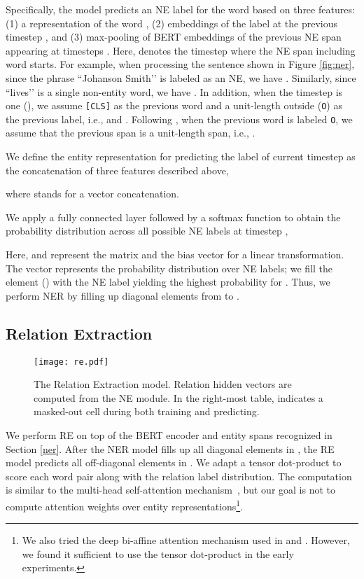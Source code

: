 \documentclass[11pt,a4paper]{article}
\begin{document}
Specifically, the model predicts an NE label for the word  based on three features: (1) a representation  of the word , (2) embeddings  of the label  at the previous timestep , and (3) max-pooling of BERT embeddings of the previous NE span appearing at timesteps . Here,  denotes the timestep where the NE span including word  starts. For example, when processing the sentence shown in Figure \ref{fig:ner}, since the phrase ``Johanson Smith’’ is labeled as an NE, we have . Similarly, since ``lives’’ is a single non-entity word, we have . In addition, when the timestep is one (), we assume {\tt [CLS]} as the previous word and a unit-length outside (\texttt{O}) as the previous label, i.e., 
 and . Following \citet{zhang-etal-2017-end}, when the previous word is labeled \texttt{O}, we assume that the previous span is a unit-length span, i.e., .

We define the entity representation for predicting the label of current timestep  as the concatenation of three features described above,

where  stands for a vector concatenation.

We apply a fully connected layer followed by a softmax function  to obtain the probability distribution across all possible NE labels at timestep ,

Here,  and  represent the matrix and the bias vector for a linear transformation. The vector  represents the probability distribution over NE labels; we fill the element  () with the NE label yielding the highest probability for . 
Thus, we perform NER by filling up diagonal elements  from  to .

\subsection{Relation Extraction}
\label{re}

    \begin{figure}[t]
    \texttt{[image: re.pdf]}
    \caption{The Relation Extraction model. Relation hidden vectors  are computed from the NE module. In the right-most table,  indicates a masked-out cell during both training and predicting.}
    \label{fig:re}
    \end{figure}



We perform RE on top of the BERT encoder and entity spans recognized in Section \ref{ner}.
After the NER model fills up all diagonal elements in , the RE model predicts all off-diagonal elements in .
We adapt a tensor dot-product to score each word pair along with the relation label distribution. The computation is similar to the multi-head self-attention mechanism~\cite{vaswani2017attention}, but our goal is not to compute attention weights over entity representations\footnote{We also tried the deep bi-affine attention mechanism used in \citet{dozat2017deep} and \citet{NguyenV_ECIR2019}. However, we found it sufficient to use the tensor dot-product in the early experiments.}.
\end{document}
